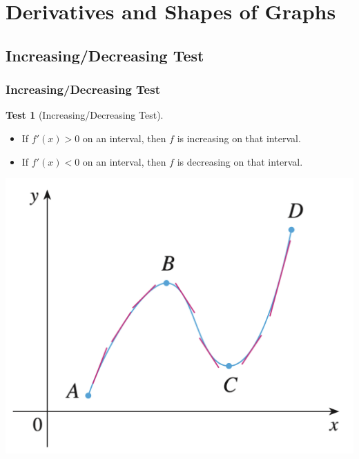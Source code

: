 \documentclass[t]{beamer}
\theoremstyle{plain}
\theoremstyle{definition}
\newtheorem{test}{Test}
\begin{document}
\section{Derivatives and Shapes of Graphs}

\subsection{Increasing/Decreasing Test}
\begin{frame}
\frametitle{Increasing/Decreasing Test}
\footnotesize
\begin{test}[Increasing/Decreasing Test]
	\begin{itemize}
		\item If $f'(x) > 0$ on an interval, then $f$ is increasing on that interval.
		\item If $f'(x) < 0$ on an interval, then $f$ is decreasing on that interval.
	\end{itemize}
\end{test}

\centering
\includegraphics[scale=0.3]{fig/increasingtest}

\end{frame}
\end{document}
